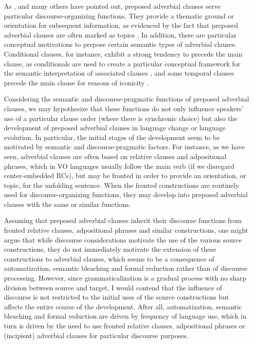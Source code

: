 \documentclass[output=paper]{langsci/langscibook}
\begin{document}
As \citet{Chafe1984}, \citet{Givón1984} and many others have pointed out, preposed adverbial clauses serve particular discourse-organizing functions. They provide a thematic ground or orientation for subsequent information, as evidenced by the fact that preposed adverbial clauses are often marked as topics \citep{Haiman1978}. In addition, there are particular conceptual motivations to prepose certain semantic types of adverbial clauses. Conditional clauses, for instance, exhibit a strong tendency to precede the main clause, as conditionals are used to create a particular conceptual framework for the semantic interpretation of associated clauses \citep{Diessel2005}, and some temporal clauses precede the main clause for reasons of iconicity \citep{Diessel2008}. 

Considering the semantic and discourse-pragmatic functions of preposed adverbial clauses, we may hypothesize that these functions do not only influence speakers’ use of a particular clause order (where there is synchronic choice) but also the development of preposed adverbial clauses in language change or language evolution. In particular, the initial stages of the development seem to be motivated by semantic and discourse-pragmatic factors. For instance, as we have seen, adverbial clauses are often based on relative clauses and adpositional phrases, which in VO languages usually follow the main verb (if we disregard center-embedded RCs), but may be fronted in order to provide an orientation, or topic, for the unfolding sentence. When the fronted constructions are routinely used for discourse-organizing functions, they may develop into preposed adverbial clauses with the same or similar functions. 

Assuming that preposed adverbial clauses inherit their discourse functions from fronted relative clauses, adpositional phrases and similar constructions, one might argue that while discourse considerations motivate the use of the various source constructions, they do not immediately motivate the extension of these constructions to adverbial clauses, which seems to be a consequence of automatization, semantic bleaching and formal reduction rather than of discourse processing. However, since grammaticalization is a gradual process with no sharp division between source and target, I would contend that the influence of discourse is not restricted to the initial uses of the source constructions but affects the entire course of the development. After all, automatization, semantic bleaching and formal reduction are driven by frequency of language use, which in turn is driven by the need to use fronted relative clauses, adpositional phrases or (incipient) adverbial clauses for particular discourse purposes.
\end{document}
